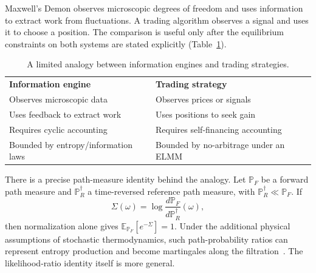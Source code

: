 \documentclass[aps,pra,reprint,superscriptaddress,amsmath,amssymb,floatfix]{revtex4-2}
\theoremstyle{plain}
\theoremstyle{definition}
\theoremstyle{remark}
\begin{document}
Maxwell's Demon observes microscopic degrees of freedom and uses information
to extract work from fluctuations. A trading algorithm observes a signal and
uses it to choose a position. The comparison is useful only after the
equilibrium constraints on both systems are stated explicitly
(Table~\ref{tab:demon}).

\begin{table}[htbp]
\caption{\label{tab:demon}A limited analogy between information engines and trading strategies.}
\centering
\begin{ruledtabular}
\begin{tabular}{p{}p{}}
\textbf{Information engine} & \textbf{Trading strategy} \\
\colrule
Observes microscopic data & Observes prices or signals \\
Uses feedback to extract work & Uses positions to seek gain \\
Requires cyclic accounting & Requires self-financing accounting \\
Bounded by entropy/information laws & Bounded by no-arbitrage under an ELMM \\
\end{tabular}
\end{ruledtabular}
\end{table}

There is a precise path-measure identity behind the analogy. Let
\(\mathbb{P}_{F}\) be a forward path measure and
\(\mathbb{P}_{R}^{\dagger}\) a time-reversed reference path measure, with
\(\mathbb{P}_{R}^{\dagger}\ll\mathbb{P}_{F}\). If
\[
  \Sigma(\omega)
  =\log\frac{d\mathbb{P}_{F}}{d\mathbb{P}_{R}^{\dagger}}(\omega),
\]
then normalization alone gives
\(\mathbb{E}_{\mathbb{P}_{F}}[e^{-\Sigma}]=1\). Under the additional physical
assumptions of stochastic thermodynamics, such path-probability ratios can
represent entropy production and become martingales along the
filtration~\cite{RoldanEtAl2023}. The likelihood-ratio identity itself is more
general.
\end{document}
